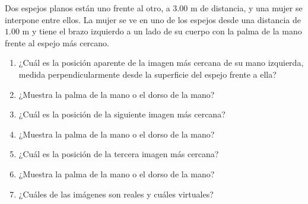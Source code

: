 \item Dos espejos planos están uno frente al otro, a $3.00\text{ m}$ de distancia, y una mujer se interpone entre ellos. La mujer se ve en uno de los espejos desde una distancia de $1.00\text{ m}$ y tiene el brazo izquierdo a un lado de su cuerpo con la palma de la mano frente al espejo más cercano.
\begin{enumerate}
    \item ¿Cuál es la posición aparente de la imagen más cercana de su mano izquierda, medida perpendicularmente desde la superficie del espejo frente a ella?
    \item ¿Muestra la palma de la mano o el dorso de la mano?
    \item ¿Cuál es la posición de la siguiente imagen más cercana?
    \item ¿Muestra la palma de la mano o el dorso de la mano?
    \item ¿Cuál es la posición de la tercera imagen más cercana?
    \item ¿Muestra la palma de la mano o el dorso de la mano?
    \item ¿Cuáles de las imágenes son reales y cuáles virtuales?
\end{enumerate}